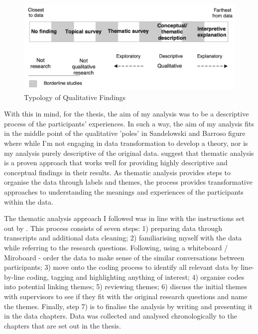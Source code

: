 \begin{figure}
    \centering
    \includegraphics[width=1\linewidth]{Images/Methodology/TypologyOfQualitativeFindings.png}
    \caption{Typology of Qualitative Findings \citep{sandelowski2003classifying}}
    \label{fig:typology}
\end{figure}

With this in mind, for the thesis, the aim of my analysis was to be a descriptive process of the participants' experiences. In such a way, the aim of my analysis fits in the middle point of the qualitative 'poles' in Sandelowski and Barroso figure where while I'm not engaging in data transformation to develop a theory, nor is my analysis purely descriptive of the original data. \citep{kiger2020thematic} suggest that thematic analysis is a proven approach that works well for providing highly descriptive and conceptual findings in their results. As thematic analysis provides steps to organise the data through labels and themes, the process provides transformative approaches to understanding the meanings and experiences of the participants within the data. 

The thematic analysis approach I followed was in line with the instructions set out by \cite{braun_one_2020}. This process consists of seven steps: 1) preparing data through transcripts and additional data cleaning; 2) familiarising myself with the data while referring to the research questions. Following, using a whiteboard / Miroboard - order the data to make sense of the similar conversations between participants; 3) move onto the coding process to identify all relevant data by line-by-line coding, tagging and highlighting anything of interest; 4) organise codes into potential linking themes; 5) reviewing themes; 6) discuss the initial themes with supervisors to see if they fit with the original research questions and name the themes. Finally, step 7) is to finalise the analysis by writing and presenting it in the data chapters. Data was collected and analysed chronologically to the chapters that are set out in the thesis.

